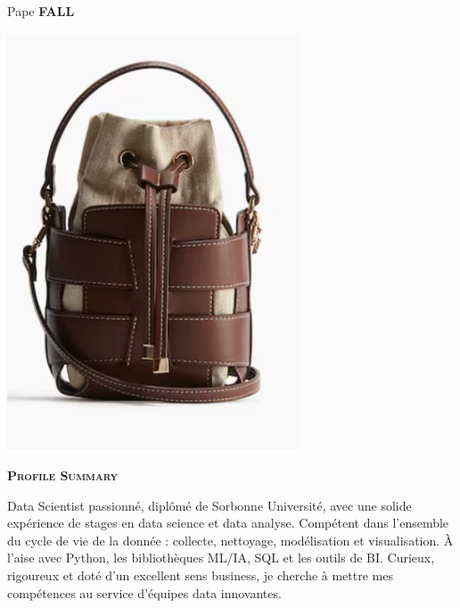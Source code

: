 \documentclass[11pt,a4paper]{article}
\newcommand{\headleft}[1]{\vspace*{3ex}\textsc{\textbf{#1}}\par%
    \vspace*{-1.5ex}\hrulefill\par\vspace*{0.7ex}}
\begin{document}
\setlength{\topskip}{0pt}\setlength{\parindent}{0pt}\setlength{\parskip}{0pt}
\setlength{\fboxsep}{0pt}\pagestyle{empty}\raggedbottom

\begin{minipage}[t]{0.33\textwidth}
\colorbox{cvblue}{\begin{minipage}[t][5mm][t]{\textwidth}\null\hfill\null\end{minipage}}
\vspace{-.2ex}
\colorbox{cvblue!90}{\color{white}
\textwidth
\begin{minipage}[t][293mm][t]{0.82\textwidth}\raggedright
\vspace*{2.5ex}

\Large Pape \textbf{\textsc{FALL}} \normalsize

\null\hfill\includegraphics[width=0.65\textwidth]{ bc42cb00a46b4cb89cd6efe8aa85a343.png }\hfill\null

\vspace*{0.5ex}

\headleft{Profile Summary}
Data Scientist passionné, diplômé de Sorbonne Université, avec une solide expérience de stages en data science et data analyse. Compétent dans l’ensemble du cycle de vie de la donnée : collecte, nettoyage, modélisation et visualisation. À l’aise avec Python, les bibliothèques ML/IA, SQL et les outils de BI. Curieux, rigoureux et doté d’un excellent sens business, je cherche à mettre mes compétences au service d’équipes data innovantes.


\end{minipage}}
\end{minipage}
\end{document}
